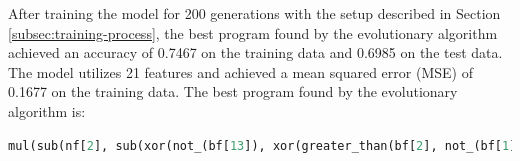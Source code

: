 \documentclass{article}
\begin{document}
After training the model for 200 generations with the setup described in Section \ref{subsec:training-process}, the best program found by the evolutionary algorithm achieved an accuracy of 0.7467 on the training data and 0.6985 on the test data. The model utilizes 21 features and achieved a mean squared error (MSE) of 0.1677 on the training data.
The best program found by the evolutionary algorithm is:
\begin{lstlisting}[language=Python, caption={Best Program Found by the Evolutionary Algorithm}, label={lst:best-program}]
    mul(sub(nf[2], sub(xor(not_(bf[13]), xor(greater_than(bf[2], not_(bf[1])), xor(not_(or_(bf[5], xor(bf[4], not_(in_range(nf[1], bf[2], sub(xor(not_(bf[13]), xor(bf[10], bf[13])), sub(nf[2], sub(sub(abs(nf[1]), sub(nf[2], -0.9059)), not_(or_(bf[5], or_(bf[5], xor(bf[4], bf[0])))))))))))), bf[13]))), sub(nf[2], sub(xor(not_(bf[13]), xor(bf[0], bf[13])), sub(nf[2], sub(sub(abs(swish(nf[1])), sub(nf[2], swish(sub(1.8002, nf[0])))), nf[1])))))), sigmoid(swish(nf[6])))
\end{lstlisting}
\end{document}
